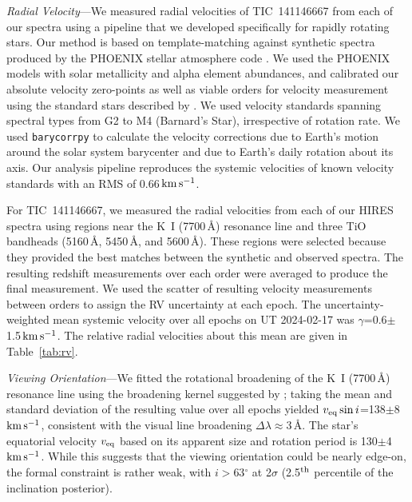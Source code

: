\documentclass{nature3}
\newcommand{\kms}{\ensuremath{\rm km\,s^{-1}}}
\begin{document}
\begin{methods}
{\it Radial Velocity}---We measured radial velocities of TIC~141146667
from each of our spectra using a pipeline that we developed specifically
for rapidly rotating stars.  Our method is based on template-matching
against synthetic spectra produced by the PHOENIX stellar atmosphere
code \cite{Husser2013}.  We used the PHOENIX models with solar
metallicity and alpha element abundances, and calibrated our absolute
velocity zero-points as well as viable orders for velocity measurement
using the standard stars described by \cite{Chubak2012}.  We used
velocity standards spanning spectral types from G2 to M4 (Barnard's
Star), irrespective of rotation rate.  We used \texttt{barycorrpy}
\cite{Kanodia2018} to calculate the velocity corrections due to Earth's
motion around the solar system barycenter and due to Earth's daily
rotation about its axis.  Our analysis pipeline reproduces the systemic
velocities of known velocity standards \cite{Chubak2012} with an RMS of
0.66\,\kms.

For TIC~141146667, we measured the radial velocities from each of our
HIRES spectra using regions near the K~I (7700\,\AA) resonance line and
three TiO bandheads (5160\,\AA, 5450\,\AA, and 5600\,\AA).  These
regions were selected because they provided the best matches between the
synthetic and observed spectra.  The resulting redshift measurements
over each order were averaged to produce the final measurement.  We used
the scatter of resulting velocity measurements between orders to assign
the RV uncertainty at each epoch.  The uncertainty-weighted mean
systemic velocity over all epochs on UT 2024-02-17 was
$\gamma$=0.6$\pm$1.5\,\kms.  The relative radial velocities about this
mean are given in Table~\ref{tab:rv}.

{\it Viewing Orientation}---We fitted the rotational broadening of the
K~I (7700\,\AA) resonance line using the broadening kernel suggested by
\cite{Gray2008}; taking the mean and standard deviation of the
resulting value over all epochs yielded $v_{\rm eq} \sin
i$=138$\pm$8\,\kms, consistent with the visual line broadening $\Delta
\lambda$$\approx$3\,\AA.  The star's equatorial velocity $v_{\rm eq}$
based on its apparent size and rotation period is 130$\pm$4\,\kms.
While this suggests that the viewing orientation could be nearly
edge-on, the formal constraint is rather weak, with $i$$>$63$^\circ$ at
2$\sigma$ (2.5$^{\rm th}$ percentile of the inclination posterior).


\end{methods}
\end{document}
